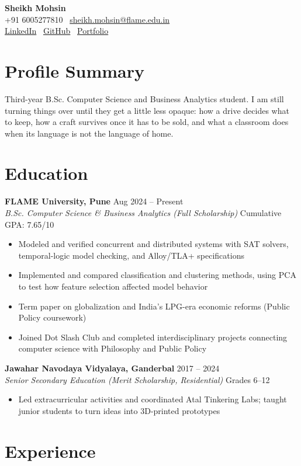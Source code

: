 \documentclass[10pt,a4paper]{article}
\newcommand{\cvheader}[6]{
    \begin{center}
        {\Large\bfseries #1}\\[0.2em]
        #2 \textbullet\ \href{mailto:#3}{#3}\\
        \href{https://linkedin.com/in/#4}{LinkedIn} \textbullet\ \href{https://github.com/#5}{GitHub} \textbullet\ \href{#6}{Portfolio}
    \end{center}
    \vspace{-0.6em}
}
\newcommand{\education}[4]{
    \textbf{#1} \hfill #2\\
    \textit{#3} \hfill #4\\[0.1em]
}
\begin{document}
\small

\cvheader{Sheikh Mohsin}{+91 6005277810}{sheikh.mohsin@flame.edu.in}{sheikh-mohsin-213653254}{notmohsin}{https://sheikhmohsin.vercel.app/}

\section*{Profile Summary}
Third-year B.Sc. Computer Science and Business Analytics student. I am still turning things over until they get a little less opaque: how a drive decides what to keep, how a craft survives once it has to be sold, and what a classroom does when its language is not the language of home.

\section*{Education}

\education{FLAME University, Pune}{Aug 2024 -- Present}{B.Sc. Computer Science \& Business Analytics (Full Scholarship)}{Cumulative GPA: 7.65/10}
\begin{itemize}[leftmargin=*, itemsep=0pt, parsep=0pt, topsep=1pt]
    \item Modeled and verified concurrent and distributed systems with SAT solvers, temporal-logic model checking, and Alloy/TLA+ specifications
    \item Implemented and compared classification and clustering methods, using PCA to test how feature selection affected model behavior
    \item Term paper on globalization and India's LPG-era economic reforms (Public Policy coursework)
    \item Joined Dot Slash Club and completed interdisciplinary projects connecting computer science with Philosophy and Public Policy
\end{itemize}

\education{Jawahar Navodaya Vidyalaya, Ganderbal}{2017 -- 2024}{Senior Secondary Education (Merit Scholarship, Residential)}{Grades 6--12}
\begin{itemize}[leftmargin=*, itemsep=0pt, parsep=0pt, topsep=1pt]
    \item Led extracurricular activities and coordinated Atal Tinkering Labs; taught junior students to turn ideas into 3D-printed prototypes
\end{itemize}

\section*{Experience}
\end{document}
